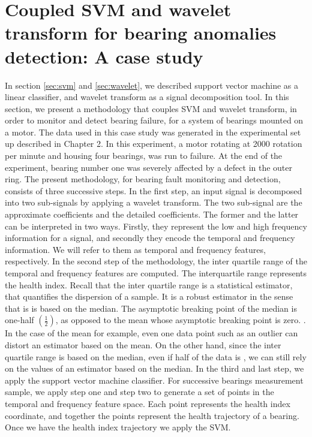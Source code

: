 \documentclass[../Main/thesis.tex]{subfiles}
\begin{document}
\section{Coupled SVM and wavelet transform for bearing anomalies detection: A case study}
\label{sec:result-svm-wavelet}
In section \ref{sec:svm} and \ref{sec:wavelet}, we described support vector machine as a linear classifier, and wavelet transform as a signal decomposition tool. In this section, we present a methodology that couples SVM and wavelet transform, in order to monitor and detect bearing failure, for a system of bearings mounted on a motor. The data used in this case study was generated in the experimental set up described in Chapter 2. In this experiment, a motor rotating at 2000 rotation per minute and housing four bearings, was run to failure. At the end of the experiment, bearing number one was severely affected by a defect in the outer ring.
\justify
The present methodology, for bearing fault monitoring and detection, consists of three successive steps. In the first step, an input signal is decomposed into two sub-signals by applying a wavelet transform. The two sub-signal are the approximate coefficients and the detailed coefficients. The former and the latter can be interpreted in two ways. Firstly, they represent the low and high frequency information for a signal, and secondly they encode the temporal and frequency information. We will refer to them as temporal and frequency features, respectively. 
\justify
In the second step of the methodology, the inter quartile range of the temporal and frequency features are computed. The interquartile range represents the health index. Recall that the inter quartile range is a statistical estimator, that quantifies the dispersion of a sample. It is a robust estimator in the sense that is is based on the median. The asymptotic breaking point of the median is one-half $\left(\frac{1}{2}\right)$, as opposed to the mean whose asymptotic breaking point is zero. . In the case of the mean for example, even one  data point such as an outlier can distort an estimator based on the mean. On the other hand, since the inter quartile range is based on the median, even if half of the data is , we can still rely on the values of an estimator based on the median. 
\justify
In the third and last step, we apply the support vector machine classifier. For successive bearings measurement sample, we apply step one and step two to generate a set of points in the temporal and frequency feature space. Each point represents the health index coordinate, and together the points represent the health trajectory of a bearing. Once we have the health index trajectory we apply the SVM.
\end{document}
